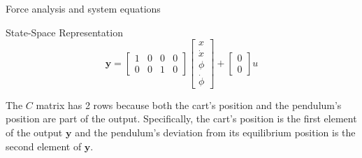 \begin{frame}{Force analysis and system equations}
\begin{block}{State-Space Representation}
\begin{equation}
\mathbf{y} =
\begin{bmatrix}
  1 & 0 & 0 & 0 \\
  0 & 0 & 1 & 0
\end{bmatrix}
\begin{bmatrix}
  x \\
  \dot{x} \\
  \phi \\
  \dot{\phi}
\end{bmatrix}
+
\begin{bmatrix}
  0 \\
  0
\end{bmatrix} u
\end{equation}

The \(C\) matrix has 2 rows because both the cart's position and the
pendulum's position are part of the output. Specifically, the cart's
position is the first element of the output \(\mathbf{y}\) and the
pendulum's deviation from its equilibrium position is the second element
of \(\mathbf{y}\).
\end{block}
\end{frame}

